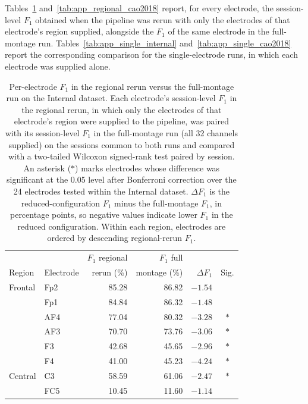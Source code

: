 \documentclass[journal,twoside,web]{ieeecolor}
\begin{document}
Tables~\ref{tab:app_regional_internal} and~\ref{tab:app_regional_cao2018} report, for every electrode, the session-level $F_1$ obtained when the pipeline was rerun with only the electrodes of that electrode's region supplied, alongside the $F_1$ of the same electrode in the full-montage run. Tables~\ref{tab:app_single_internal} and~\ref{tab:app_single_cao2018} report the corresponding comparison for the single-electrode runs, in which each electrode was supplied alone.

\begin{table}[htbp]
  \centering
  \renewcommand{\baselinestretch}{1}\normalsize
  \caption{Per-electrode $F_1$ in the regional rerun versus the full-montage run on the Internal dataset. Each electrode's session-level $F_1$ in the regional rerun, in which only the electrodes of that electrode's region were supplied to the pipeline, was paired with its session-level $F_1$ in the full-montage run (all 32 channels supplied) on the sessions common to both runs and compared with a two-tailed Wilcoxon signed-rank test paired by session. An asterisk ($*$) marks electrodes whose difference was significant at the 0.05 level after Bonferroni correction over the 24 electrodes tested within the Internal dataset. $\Delta F_1$ is the reduced-configuration $F_1$ minus the full-montage $F_1$, in percentage points, so negative values indicate lower $F_1$ in the reduced configuration. Within each region, electrodes are ordered by descending regional-rerun $F_1$.}
  \label{tab:app_regional_internal}
  \footnotesize
  \setlength{\tabcolsep}{2.5pt}
  \begin{tabular}{@{}llrrrc@{}}
    \toprule
     &  & $F_1$ regional & $F_1$ full &  & \\
    Region & Electrode & rerun (\%) & montage (\%) & $\Delta F_1$ & Sig. \\
    \midrule
    Frontal & Fp2 & 85.28 & 86.82 & $-1.54$ & \\
     & Fp1 & 84.84 & 86.32 & $-1.48$ & \\
     & AF4 & 77.04 & 80.32 & $-3.28$ & $*$ \\
     & AF3 & 70.70 & 73.76 & $-3.06$ & $*$ \\
     & F3 & 42.68 & 45.65 & $-2.96$ & $*$ \\
     & F4 & 41.00 & 45.23 & $-4.24$ & $*$ \\
    \addlinespace
    Central & C3 & 58.59 & 61.06 & $-2.47$ & $*$ \\
     & FC5 & 10.45 & 11.60 & $-1.14$ & \\

\end{tabular}
\end{table}
\end{document}
